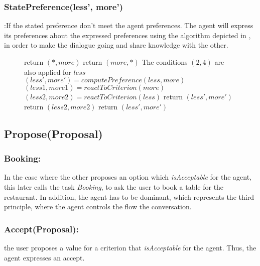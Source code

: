 \documentclass{llncs}
\begin{document}
 		\subsubsection{StatePreference(less', more')} :If the stated preference don't meet the agent preferences. The agent will express its preferences about the expressed preferences using the algorithm depicted in , in order to make the dialogue going and share knowledge with the other.
 	\begin{figure}[h]
 		\begin{algorithmic}[1]\small
 			
 			\State return $(*, more)$
 			\EndIf
 			\State return $(more, *) $
 			\EndIf
 			\State The conditions $(2,4)$ are also applied for $less$
 			\State $(less',more') = computePreference(less,more)$
 			\State $(less1,more1)= reactToCriterion(more)$
 			\State $(less2,more2)= reactToCriterion(less)$
 			\State return $(less',more')$
 			\Else  
 			return $(less2,more2)$
 			\EndIf
 			\EndIf
 			\EndIf
 			\State return $(less', more')$
 			\EndFunction
 			
 		\end{algorithmic}
 		\vskip 8pt
 	\end{figure}
 
 \subsection{Propose(Proposal)}
 
 \subsubsection{Booking:} In the case where the other proposes an option which \emph{isAcceptable} for the agent, this later calls the task \textit{Booking}, to ask the user to book a table for the restaurant. In addition, the agent has to be dominant, which represents the third principle, where the agent controls the flow the conversation.
 
 \subsubsection{Accept(Proposal):} the user proposes a value for a criterion that \emph{isAcceptable} for the agent. Thus, the agent expresses an accept.
 
\end{document}
